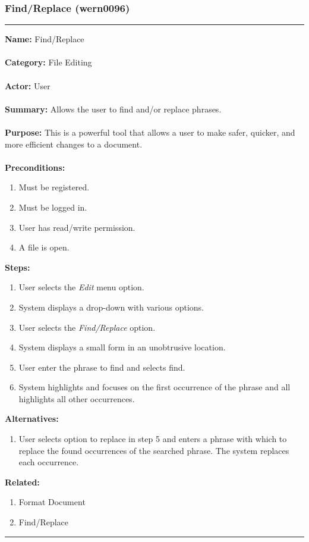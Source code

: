 \documentclass[11pt]{report}
\begin{document}
\subsubsection{Find/Replace (wern0096)}
\vspace{2pt}
\hrule
\vspace{8pt}
	\noindent\textbf{Name:} Find/Replace \\ \\
	\textbf{Category:} File Editing \\ \\
	\textbf{Actor:} User \\ \\
	\textbf{Summary:} Allows the user to find and/or replace phrases. \\ \\
	\textbf{Purpose:} This is a powerful tool that allows a user to make safer, quicker, and more efficient changes to a document. \\ \\
	\textbf{Preconditions:} 
	\begin{enumerate}
		\item Must be registered.
		\item Must be logged in.
		\item User has read/write permission.
		\item A file is open.
	\end{enumerate}
	\textbf{Steps:}
	\begin{enumerate}
		\item User selects the \textit{Edit} menu option.
		\item System displays a drop-down with various options.
		\item User selects the \textit{Find/Replace} option.
		\item System displays a small form in an unobtrusive location.
		\item User enter the phrase to find and selects find.
		\item System highlights and focuses on the first occurrence of the phrase and all highlights all other occurrences.
	\end{enumerate}
	\textbf{Alternatives:}
	\begin{enumerate}
		\item User selects option to replace in step 5 and enters a phrase with which to replace the found occurrences of the searched phrase. The system replaces each occurrence.
	\end{enumerate}
	\textbf{Related:}
	\begin{enumerate}
		\item Format Document
		\item Find/Replace
	\end{enumerate}
\hrule
\vspace{8pt}
\newpage
\end{document}
